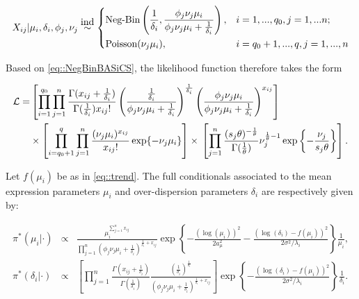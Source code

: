 \begin{equation} \label{eq::NegBinBASiCS}
 X_{ij}|\mu_i,\delta_i,\phi_j,\nu_j \stackrel{\mbox{ind}}{\sim}
 \left\lbrace
  \begin{aligned}
    &\textnormal{Neg-Bin}\left(\frac{1}{\delta_i},\frac{\phi_j\nu_j\mu_i}{\phi_j\nu_j\mu_i+\frac{1}{\delta_i}}\right), && i=1,...,q_0,j=1,...n;  \\ 
    &\textnormal{Poisson}(\nu_j\mu_i), && i=q_0+1,...,q,j=1,...,n        
  \end{aligned}
\right.
\end{equation}

Based on \ref{eq::NegBinBASiCS}, the likelihood function therefore takes the form

\begin{align} \label{eq::loglik}
\mathcal{L} = & \left[\prod_{i=1}^{q_0}\prod_{j=1}^n\frac{\Gamma(x_{ij}+\frac{1}{\delta_i})}{\Gamma(\frac{1}{\delta_i})x_{ij}!}\left(\frac{\frac{1}{\delta_i}}{\phi_j\nu_j\mu_i+\frac{1}{\delta_i}}\right)^\frac{1}{\delta_i}\left(\frac{\phi_j\nu_j\mu_i}{\phi_j\nu_j\mu_i+\frac{1}{\delta_i}}\right)^{x_{ij}}\right] \nonumber\\ 
&\times\left[\prod_{i=q_0+1}^{q}\prod_{j=1}^n\frac{(\nu_j\mu_i)^{x_{ij}}}{x_{ij}!}\exp\lbrace-\nu_j\mu_i\rbrace\right]\times{}\left[\prod_{j=1}^n\frac{(s_j\theta)^{-\frac{1}{\theta}}}{\Gamma(\frac{1}{\theta})}\nu_j^{\frac{1}{\theta}-1}\exp\left\lbrace-\frac{\nu_j}{s_j\theta}\right\rbrace\right].
\end{align} 

Let $f(\mu_i)$ be as in \ref{eq::trend}. The full conditionals associated to the mean expression parameters $\mu_i$ and over-dispersion parameters $\delta_i$ are respectively given by:

\begin{footnotesize} \begin{eqnarray} \label{eq::FullCondMuDelta}
\pi^*(\mu_i|\cdot) & \propto & \frac{\mu_i^{\sum_{j=1}^n{}x_{ij}}}{\prod_{j=1}^n{}(\phi_j\nu_j\mu_i+\frac{1}{\delta_i})^{\frac{1}{\delta_i}+x_{ij}}} \exp\left\{-\frac{(\log(\mu_i))^2}{2a_\mu^2}-\frac{(\log(\delta_i)-f(\mu_i))^2}{2\sigma^2 / \lambda_i }\right\} \frac{1}{\mu_i}, \\
\pi^*(\delta_i|\cdot) & \propto & \left[\prod_{j=1}^n\frac{\Gamma(x_{ij}+\frac{1}{\delta_i})}{\Gamma(\frac{1}{\delta_i})}\frac{(\frac{1}{\delta_i})^{\frac{1}{\delta_i}}}{(\phi_j\nu_j\mu_i+\frac{1}{\delta_i})^{\frac{1}{\delta_i}+x_{ij}}}\right] \exp\left\{-\frac{(\log(\delta_i)-f(\mu_i))^2}{2\sigma^2 / \lambda_i}\right\} \frac{1}{\delta_i}.
\end{eqnarray} \end{footnotesize}

